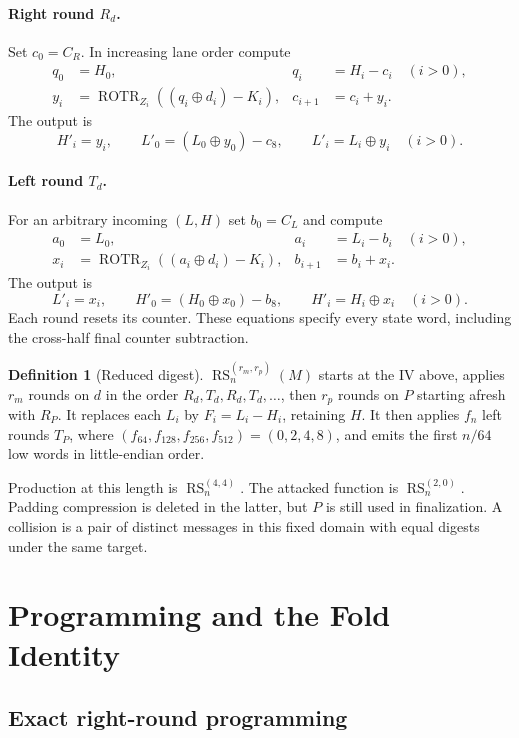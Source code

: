 \documentclass[10pt]{article}
\theoremstyle{definition}
\newtheorem{definition}{Definition}
\newcommand{\ROTR}{\operatorname{ROTR}}
\newcommand{\RS}{\operatorname{RS}}
\begin{document}
\paragraph{Right round $R_d$.}
Set $c_0=C_R$. In increasing lane order compute
\begin{align}
q_0&=H_0,&q_i&=H_i-c_i\quad(i>0),\\
y_i&=\ROTR_{Z_i}((q_i\oplus d_i)-K_i),&c_{i+1}&=c_i+y_i.
\end{align}
The output is
\[
H'_i=y_i,\qquad L'_0=(L_0\oplus y_0)-c_8,\qquad
L'_i=L_i\oplus y_i\quad(i>0).
\]

\paragraph{Left round $T_d$.}
For an arbitrary incoming $(L,H)$ set $b_0=C_L$ and compute
\begin{align}
a_0&=L_0,&a_i&=L_i-b_i\quad(i>0),\\
x_i&=\ROTR_{Z_i}((a_i\oplus d_i)-K_i),&b_{i+1}&=b_i+x_i.
\end{align}
The output is
\[
L'_i=x_i,\qquad H'_0=(H_0\oplus x_0)-b_8,\qquad
H'_i=H_i\oplus x_i\quad(i>0).
\]
Each round resets its counter. These equations specify every state word, including the cross-half final counter subtraction.

\begin{definition}[Reduced digest]
$\RS_n^{(r_m,r_p)}(M)$ starts at the IV above, applies $r_m$ rounds on $d$ in the order $R_d,T_d,R_d,T_d,\ldots$, then $r_p$ rounds on $P$ starting afresh with $R_P$. It replaces each $L_i$ by $F_i=L_i-H_i$, retaining $H$. It then applies $f_n$ left rounds $T_P$, where $(f_{64},f_{128},f_{256},f_{512})=(0,2,4,8)$, and emits the first $n/64$ low words in little-endian order.
\end{definition}
Production at this length is $\RS_n^{(4,4)}$. The attacked function is $\RS_n^{(2,0)}$. Padding compression is deleted in the latter, but $P$ is still used in finalization. A collision is a pair of distinct messages in this fixed domain with equal digests under the same target.

\section{Programming and the Fold Identity}
\label{sec:programming}
\subsection{Exact right-round programming}
\end{document}
